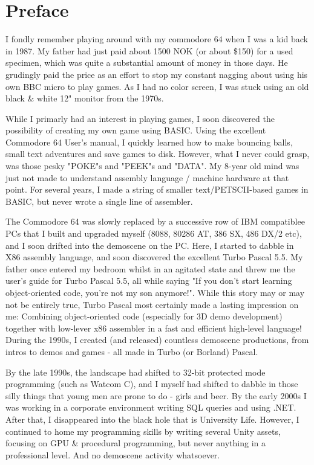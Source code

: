 \chapter*{Preface}

I fondly remember playing around with my commodore 64 when I was a kid back in 1987. My father had just paid about 1500 NOK  (or about \$150) for a used specimen, which was quite a substantial amount of money in those days. He grudingly paid the price as an effort to stop my constant nagging about using his own BBC micro to play games. As I had no color screen, I was stuck using an old black \& white 12" monitor from the 1970s. 

While I primarly had an interest in playing games, I soon discovered the possibility of creating my own game using BASIC. Using the excellent Commodore 64 User's manual, I quickly learned how to make bouncing balls, small text adventures and save games to disk. However, what I never could grasp, was those pesky "POKE"s and "PEEK"s and "DATA". My 8-year old mind was just not made to understand assembly language / machine hardware at that point. For several years, I made a string of smaller text/PETSCII-based games in BASIC, but never wrote a single line of assembler. 

The Commodore 64 was slowly replaced by a successive row of IBM compatiblee PCs that I built and upgraded myself (8088, 80286 AT, 386 SX, 486 DX/2 etc), and I soon drifted into the demoscene on the PC. Here, I started to dabble in X86 assembly language, and soon discovered the excellent Turbo Pascal 5.5. My father once entered my bedroom whilst in an agitated state and threw me the user's guide for Turbo Pascal 5.5, all while saying "If you don't start learning object-oriented code, you're not my son anymore!".  While this story may or may not be entirely true, Turbo Pascal most certainly made a lasting impression on me: Combining object-oriented code (especially for 3D demo development) together with low-lever x86 assembler in a fast and efficient high-level language! During the 1990s, I created (and released) countless demoscene productions, from intros to demos and games - all made in Turbo (or Borland) Pascal.

By the late 1990s, the landscape had shifted to 32-bit protected mode programming (such as Watcom C), and I myself had shifted to dabble in those silly things that young men are prone to do - girls and beer. By the early 2000s I was working in a corporate environment writing SQL queries and using .NET. After that, I disappeared into the black hole that is University Life. However, I continued to home my programming skills by writing several Unity assets, focusing on GPU \& procedural programming, but never anything in a professional level. And no demoscene activity whatsoever. 

